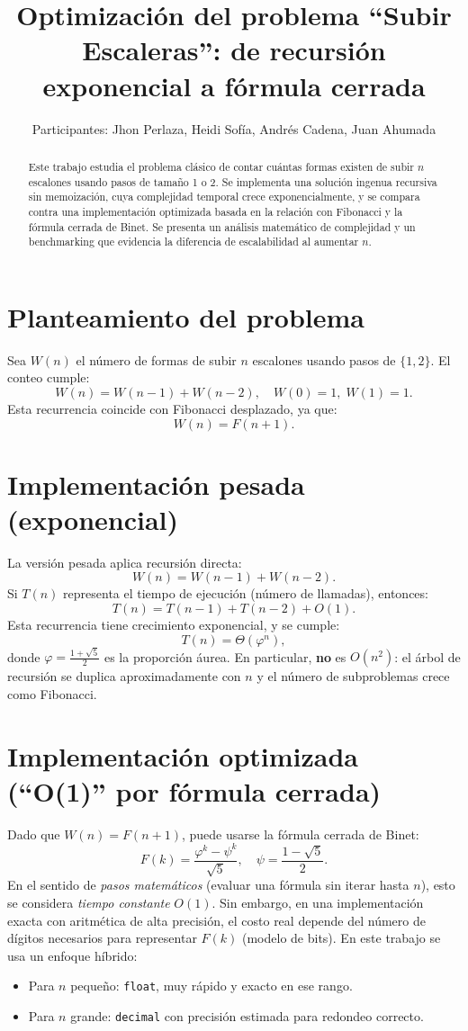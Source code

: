 \documentclass[twocolumn]{article}
\title{Optimización del problema ``Subir Escaleras'': de recursión exponencial a fórmula cerrada}
\author{Participantes: Jhon Perlaza, Heidi Sofía, Andrés Cadena, Juan Ahumada}
\date{}
\begin{document}
\maketitle

\begin{abstract}
Este trabajo estudia el problema clásico de contar cuántas formas existen de subir $n$ escalones usando pasos de tamaño 1 o 2. Se implementa una solución ingenua recursiva sin memoización, cuya complejidad temporal crece exponencialmente, y se compara contra una implementación optimizada basada en la relación con Fibonacci y la fórmula cerrada de Binet. Se presenta un análisis matemático de complejidad y un benchmarking que evidencia la diferencia de escalabilidad al aumentar $n$.
\end{abstract}

\section{Planteamiento del problema}
Sea $W(n)$ el número de formas de subir $n$ escalones usando pasos de $\{1,2\}$. El conteo cumple:
\[
W(n) = W(n-1) + W(n-2), \quad W(0)=1,\; W(1)=1.
\]
Esta recurrencia coincide con Fibonacci desplazado, ya que:
\[
W(n) = F(n+1).
\]

\section{Implementación pesada (exponencial)}
La versión pesada aplica recursión directa:
\[
W(n)=W(n-1)+W(n-2).
\]
Si $T(n)$ representa el tiempo de ejecución (número de llamadas), entonces:
\[
T(n)=T(n-1)+T(n-2)+O(1).
\]
Esta recurrencia tiene crecimiento exponencial, y se cumple:
\[
T(n)=\Theta(\varphi^n),
\]
donde $\varphi=\frac{1+\sqrt{5}}{2}$ es la proporción áurea. En particular, \textbf{no} es $O(n^2)$: el árbol de recursión se duplica aproximadamente con $n$ y el número de subproblemas crece como Fibonacci.

\section{Implementación optimizada (``O(1)'' por fórmula cerrada)}
Dado que $W(n)=F(n+1)$, puede usarse la fórmula cerrada de Binet:
\[
F(k)=\frac{\varphi^k-\psi^k}{\sqrt{5}},
\quad
\psi=\frac{1-\sqrt{5}}{2}.
\]
En el sentido de \emph{pasos matemáticos} (evaluar una fórmula sin iterar hasta $n$), esto se considera \emph{tiempo constante} $O(1)$. Sin embargo, en una implementación exacta con aritmética de alta precisión, el costo real depende del número de dígitos necesarios para representar $F(k)$ (modelo de bits). En este trabajo se usa un enfoque híbrido:
\begin{itemize}
\item Para $n$ pequeño: \texttt{float}, muy rápido y exacto en ese rango.
\item Para $n$ grande: \texttt{decimal} con precisión estimada para redondeo correcto.
\end{itemize}
\end{document}
